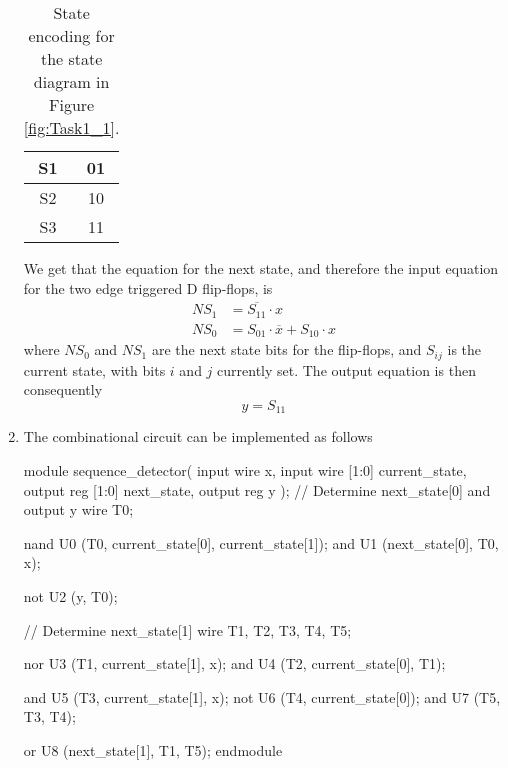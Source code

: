 \documentclass[a4paper,11pt,norsk]{article}
\begin{document}
\begin{enumerate}
\begin{table}[H]
\begin{tabular}{|c|c|}
                S1   & 01 \\ \hline
                S2   & 10 \\ \hline
                S3   & 11 \\ \hline
            \end{tabular}
            \caption{State encoding for the state diagram in Figure \ref{fig:Task1_1}.}
            \label{tab:Task1_3}
        \end{table}
        We get that the equation for the next state, and therefore the input equation for the two edge triggered D flip-flops, is
        \begin{align*}
            NS_1 &= \overline{S_{11}} \cdot x \\
            NS_0 &= S_{01} \cdot \overline{x} + S_{10} \cdot x
        \end{align*}
        where $NS_0$ and $NS_1$ are the next state bits for the flip-flops, and $S_{ij}$ is the current state, with bits $i$ and $j$ currently set.
        The output equation is then consequently
        \begin{equation*}
            y = S_{11}
        \end{equation*}
    \item The combinational circuit can be implemented as follows
\begin{codebox}[verilog]
module sequence_detector(
    input wire x,
    input wire [1:0] current_state,
    output reg [1:0] next_state,
    output reg y
);
    // Determine next_state[0] and output y
    wire T0;

    nand U0 (T0, current_state[0], current_state[1]);
    and U1 (next_state[0], T0, x);

    not U2 (y, T0);

    // Determine next_state[1]
    wire T1, T2, T3, T4, T5;

    nor U3 (T1, current_state[1], x);
    and U4 (T2, current_state[0], T1);

    and U5 (T3, current_state[1], x);
    not U6 (T4, current_state[0]);
    and U7 (T5, T3, T4);

    or U8 (next_state[1], T1, T5);
endmodule
\end{codebox}


\end{enumerate}
\end{document}
